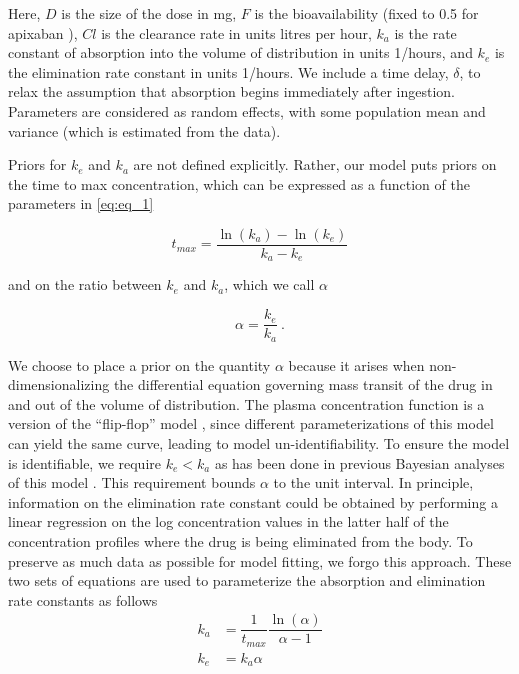 \noindent Here, $D$ is the size of the dose in mg, $F$ is the bioavailability (fixed to 0.5 for apixaban \cite{Byon2019-gf}), $\mathit{Cl}$ is the clearance rate in units litres per hour, $k_a$ is the rate constant of absorption into the volume of distribution in units 1/hours, and $k_e$ is the elimination rate constant in units 1/hours. We include a time delay, $\delta$, to relax the assumption that absorption begins immediately after ingestion.  Parameters are considered as random effects, with some population mean and variance (which is estimated from the data). 

Priors for $k_e$ and $k_a$ are not defined explicitly.  Rather, our model puts priors on the time to max concentration, which can be expressed as a function of the parameters in \cref{eq:eq_1}

\begin{equation}\label{eq:eq_2}
 t_{\mathit{max}} = \dfrac{\ln(k_a) - \ln(k_e)}{k_a - k_e}
\end{equation}

\noindent and on the ratio between $k_e$ and $k_a$, which we call $\alpha$

\begin{equation}\label{eq:eq_3}
\alpha  = \dfrac{k_e}{k_a} \>.
\end{equation}

\noindent We choose to place a prior on the quantity $\alpha$ because it arises when non-dimensionalizing \cite{Lin1988-pr} the differential equation governing mass transit of the drug in and out of the volume of distribution.  The plasma concentration function is a version of the “flip-flop” model \cite{Wakefield1996-yy, Salway2008-gi}, since different parameterizations of this model can yield the same curve, leading to model un-identifiability. To ensure the model is identifiable, we require $k_e<k_a$ as has been done in previous Bayesian analyses of this model \cite{Wakefield1996-yy, Salway2008-gi}. This requirement bounds $\alpha$ to the unit interval.  In principle, information on the elimination rate constant could be obtained by performing a linear regression on the log concentration values in the latter half of the concentration profiles where the drug is being eliminated from the body. To preserve as much data as possible for model fitting, we forgo this approach.  These two sets of equations are used to parameterize the absorption and elimination rate constants as follows
\begin{align}
	k_a &= \dfrac{1}{t_{\mathit{max}}} \dfrac{\ln(\alpha)}{\alpha-1} \label{eq:eq_4} \\
	k_e &= k_a \alpha \label{eq:eq_5}
\end{align}

